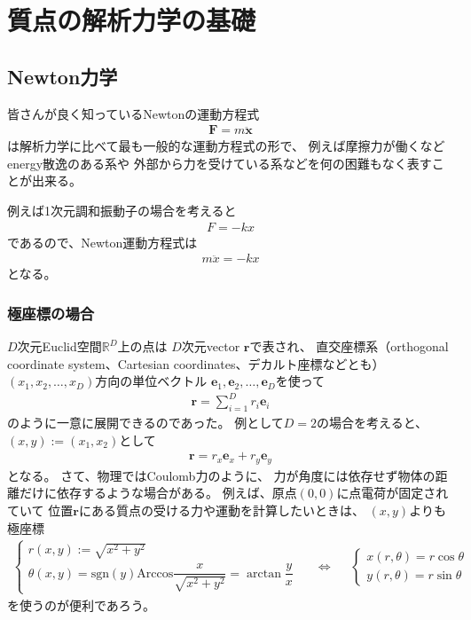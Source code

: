 \section{質点の解析力学の基礎}

\subsection{Newton力学}

皆さんが良く知っているNewtonの運動方程式
\begin{align}
  \bm{F} = m\ddot{\bm{x}}
\label{newton eom}
\end{align}
は解析力学に比べて最も一般的な運動方程式の形で、
例えば摩擦力が働くなどenergy散逸のある系や
外部から力を受けている系などを何の困難もなく表すことが出来る。

例えば1次元調和振動子の場合を考えると
\begin{align}
  F = -k x
\end{align}
であるので、Newton運動方程式は
\begin{align}
  m\ddot{x} = - k x
\label{newton harm osci eom}
\end{align}
となる。

\subsubsection{極座標の場合}

$D$次元Euclid空間$\mathbb{R}^D$上の点は
$D$次元vector $\bm{r}$で表され、
直交座標系（orthogonal coordinate system、Cartesian coordinates、デカルト座標などとも）
$(x_1, x_2, \dots, x_D)$方向の単位ベクトル
$\bm{e}_1, \bm{e}_2, \dots, \bm{e}_D$を使って
\begin{align}
  \bm{r} = \sum_{i = 1}^D r_i \bm{e}_i
\end{align}
のように一意に展開できるのであった。
例として$D = 2$の場合を考えると、
$(x,y) := (x_1, x_2)$として
\begin{align}
  \bm{r} = r_x \bm{e}_x + r_y \bm{e}_y
\end{align}
となる。
さて、物理ではCoulomb力のように、
力が角度には依存せず物体の距離だけに依存するような場合がある。
例えば、原点$(0, 0)$に点電荷が固定されていて
位置$\bm{r}$にある質点の受ける力や運動を計算したいときは、
$(x, y)$よりも極座標
\begin{align}
  \begin{cases}
    r(x, y) := \sqrt{x^2 + y^2}
  \\
    \theta(x, y)
    =
    \mathrm{sgn} (y) \mathrm{Arccos}
    \dfrac{x}{ \sqrt{x^2 + y^2} }
    =
    \arctan \dfrac{y}{x}
  \end{cases}
&&\Leftrightarrow&&
  \begin{cases}
    x(r, \theta) = r \cos\theta
  \\
    y(r, \theta) = r \sin\theta
  \end{cases}
\end{align}
を使うのが便利であろう。

